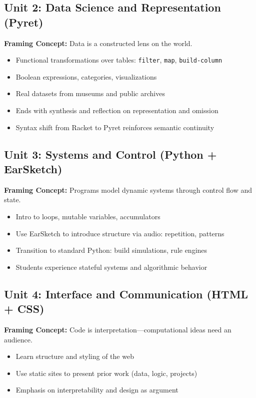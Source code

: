 \documentclass[11pt]{article}
\begin{document}
\subsection*{Unit 2: Data Science and Representation (Pyret)}
\textbf{Framing Concept:} Data is a constructed lens on the world.
\begin{itemize}[leftmargin=*]
  \item Functional transformations over tables: \texttt{filter}, \texttt{map}, \texttt{build-column}
  \item Boolean expressions, categories, visualizations
  \item Real datasets from museums and public archives
  \item Ends with synthesis and reflection on representation and omission
  \item Syntax shift from Racket to Pyret reinforces semantic continuity
\end{itemize}

\subsection*{Unit 3: Systems and Control (Python + EarSketch)}
\textbf{Framing Concept:} Programs model dynamic systems through control flow and state.
\begin{itemize}[leftmargin=*]
  \item Intro to loops, mutable variables, accumulators
  \item Use EarSketch to introduce structure via audio: repetition, patterns
  \item Transition to standard Python: build simulations, rule engines
  \item Students experience stateful systems and algorithmic behavior
\end{itemize}

\subsection*{Unit 4: Interface and Communication (HTML + CSS)}
\textbf{Framing Concept:} Code is interpretation---computational ideas need an audience.
\begin{itemize}[leftmargin=*]
  \item Learn structure and styling of the web
  \item Use static sites to present prior work (data, logic, projects)
  \item Emphasis on interpretability and design as argument
\end{itemize}
\end{document}
